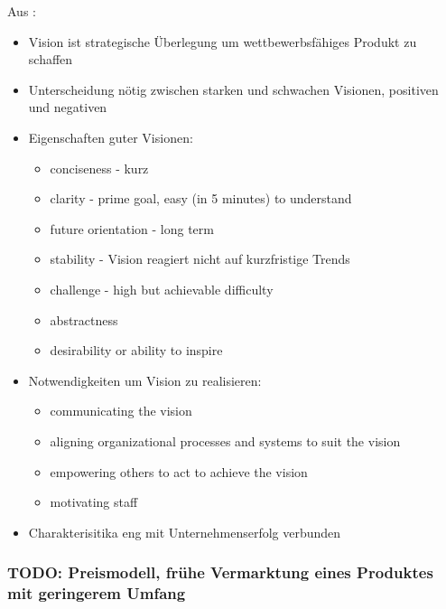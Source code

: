Aus :
\begin{itemize}
	\item Vision ist strategische Überlegung um wettbewerbsfähiges Produkt 
zu schaffen
	\item Unterscheidung nötig zwischen starken und schwachen Visionen, 
positiven und negativen
	\item Eigenschaften guter Visionen: \\
	\begin{itemize}
		\item conciseness - kurz
		\item clarity - prime goal, easy (in 5 minutes) to understand
		\item future orientation - long term
		\item stability - Vision reagiert nicht auf kurzfristige Trends
		\item challenge - high but achievable difficulty
		\item abstractness
		\item desirability or ability to inspire
	\end{itemize}
	\item Notwendigkeiten um Vision zu realisieren: \\
	\begin{itemize}
		\item communicating the vision
		\item aligning organizational processes and systems to suit the 
vision
		\item empowering others to act to achieve the vision
		\item motivating staff
	\end{itemize}
	\item Charakterisitika eng mit Unternehmenserfolg verbunden


\end{itemize}

\subsubsection{TODO: Preismodell, frühe Vermarktung eines Produktes mit 
geringerem Umfang}

